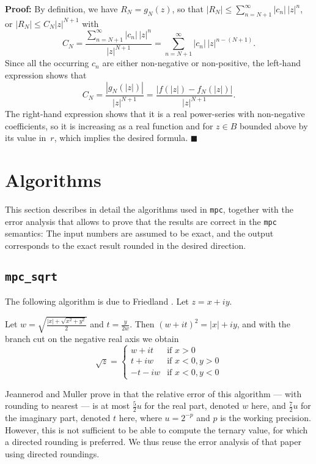 \documentclass [11pt]{article}
\newcommand {\mpc}{{\tt mpc}}
\renewcommand {\leq}{\leqslant}
\newenvironment{proof}{\noindent \textbf {Proof:}}{{\hspace* {\fill}$\blacksquare$}}
\begin{document}
\begin {proof}
By definition, we have $R_N = g_N (z)$, so that
$|R_N| \leq \sum_{n=N+1}^\infty |c_n| \, |z|^n$,
or
$|R_N| \leq C_N |z|^{N+1}$
with
\[
C_N = \frac {\sum_{n=N+1}^\infty |c_n| \, |z|^n}{|z|^{N+1}}
    = \sum_{n=N+1}^\infty |c_n| \, |z|^{n - (N+1)}.
\]
Since all the occurring $c_n$ are either non-negative or non-positive,
the left-hand expression shows that
\[
C_N = \frac {|g_N (|z|)|}{|z|^{N+1}}
    = \frac {|f (|z|) - f_N (|z|)|}{|z|^{N+1}}.
\]
The right-hand expression shows that it is a real power-series with
non-negative coefficients, so it is increasing as a real function and
for $z \in B$ bounded above by its value in~$r$, which implies the
desired formula.
\end {proof}




\section {Algorithms}
\label {sec:algorithms}

This section describes in detail the algorithms used in \mpc, together with
the error analysis that allows to prove that the results are correct in the
{\mpc} semantics: The input numbers are assumed to be exact, and the output
corresponds to the exact result rounded in the desired direction.


\subsection {\texttt {mpc\_sqrt}}

The following algorithm is due to Friedland \cite{Friedland67,Smith98}.
Let $z = x + i y$.

Let $w = \sqrt { \frac {|x| + \sqrt {x^2 + y^2}}{2}}$ and
$t = \frac {y}{2w}$. Then $(w + it)^2 = |x| + iy$, and with the branch cut on the negative real axis we obtain
\[
\sqrt z = \left\{
\begin {array}{cl}
w + i t & \text {if } x > 0 \\
t + i w & \text {if } x < 0, y > 0 \\
-t - i w & \text {if } x < 0, y < 0
\end {array}
\right.
\]

Jeannerod and Muller prove in \cite{jeannerod:ensl-01780265} that the relative
error of this algorithm --- with rounding to nearest ---
is at most $\frac{5}{2} u$ for the real part, denoted
$w$ here, and
$\frac{7}{2} u$ for the imaginary part, denoted $t$ here,
where $u = 2^{-p}$ and $p$ is the
working precision.
However, this is not sufficient to be able to compute the ternary value,
for which a directed rounding is preferred.
We thus reuse the error analysis of that paper using directed roundings.
\end{document}
